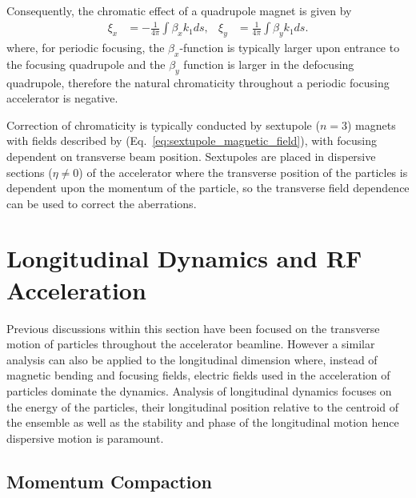 \documentclass[../main.tex]{subfiles}
\begin{document}
Consequently, the chromatic effect of a quadrupole magnet is given by
\begin{align}
\xi_{x} &= -\frac{1}{4\pi}\int\beta_{x}k_{1}ds, &
\xi_{y} &= \frac{1}{4\pi}\int\beta_{y}k_{1}ds.
\label{eq:quadrupole_chromaticity}
\end{align}
where, for periodic focusing, the $\beta_{x}$-function is typically larger upon entrance to the focusing quadrupole and the $\beta_{y}$ function is larger in the defocusing quadrupole, therefore the natural chromaticity throughout a periodic focusing accelerator is negative. 

Correction of chromaticity is typically conducted by sextupole ($n=3$) magnets with fields described by (Eq.~\ref{eq:sextupole_magnetic_field}), with focusing dependent on transverse beam position. Sextupoles are placed in dispersive sections ($\eta \neq 0$) of the accelerator where the transverse position of the particles is dependent upon the momentum of the particle, so the transverse field dependence can be used to correct the aberrations. 

\section{Longitudinal Dynamics and RF Acceleration}

Previous discussions within this section have been focused on the transverse motion of particles throughout the accelerator beamline. However a similar analysis can also be applied to the longitudinal dimension where, instead of magnetic bending and focusing fields, electric fields used in the acceleration of particles dominate the dynamics. Analysis of longitudinal dynamics focuses on the energy of the particles, their longitudinal position relative to the centroid of the ensemble as well as the stability and phase of the longitudinal motion hence dispersive motion is paramount.

\subsection{Momentum Compaction}
\label{sec:momentum_compaction}
\end{document}
